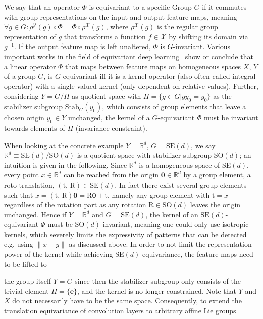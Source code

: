 We say that an operator $\Phi$ is equivariant to a specific Group $G$ if it commutes with group representations on the input and output feature maps, meaning $\forall g \in  G: \rho^\mathcal{Y}(g)\circ\Phi = \Phi \circ \rho^\mathcal{X}(g)$, where $\rho^\mathcal{X}(g)$ is the regular group representation of $g$ that transforms a function $f\in \mathcal{X}$ by shifting its domain via $g^{-1}$. If the output feature map is left unaltered, $\Phi$ is $G$-invariant. 
Various important works in the field of equivariant deep learning~\cite{cohen2019general,bekkers2020bspline,kondor2018generalization} show or conclude that a linear operator $\Phi$ that maps between feature maps on homogeneous spaces $X$, $Y$ of a group $G$, is $G$-equivariant iff it is a kernel operator (also often called integral operator) with a single-valued kernel (only dependent on relative values). Further, considering $Y=G/H$ as quotient space with $H=\{g\in G|g y_0 = y_0\}$ as the stabilizer subgroup $\text{Stab}_G(y_0)$, which consists of group elements that leave a chosen origin $y_0 \in Y$ unchanged, the kernel of a $G$-equivariant $\Phi$ must be invariant towards elements of $H$ (invariance constraint). 

When looking at the concrete example $Y=\mathbb{R}^d$, $G=\text{SE}(d)$, we say $\mathbb{R}^d \equiv \text{SE}(d)/\text{SO}(d)$ is a quotient space with stabilizer subgroup SO$(d)$; an intuition is given in the following.
Since $\mathbb{R}^d$ is a homogeneous space of SE$(d)$, every point $x\in \mathbb{R}^d$ can be reached from the origin $\mathbf{0}\in \mathbb{R}^d$ by a group element, a roto-translation, $(\text{t, R}) \in \text{SE}(d)$. 
In fact there exist several group elements such that $x = (\text{t, R})\mathbf{0} = \text{R}\mathbf{0}+\text{t}$, namely any group element with $\text{t}=x$ regardless of the rotation part as any rotation $\text{R}\in \text{SO}(d)$ leaves the origin unchanged. 
Hence if $Y=\mathbb{R}^d$ and $G=\text{SE}(d)$, the kernel of an $\text{SE}(d)$-equivariant $\Phi$ must be $\text{SO}(d)$-invariant, meaning one could only use isotropic kernels, which severely limits the expressivity of patterns that can be detected e.g. using  $\| x- y \|$ as discussed above. In order to not limit the representation power of the kernel while achieving SE$(d)$ equivariance, the feature maps need to be lifted to 

the group itself $Y=G$ since then the stabilizer subgroup only consists of the trivial element $ H =\{\mathbf{e}\}$, and the kernel is no longer constrained. Note that $Y$ and $X$ do not necessarily have to be the same space.
Consequently, to extend the translation equivariance of convolution layers to arbitrary affine Lie groups 

